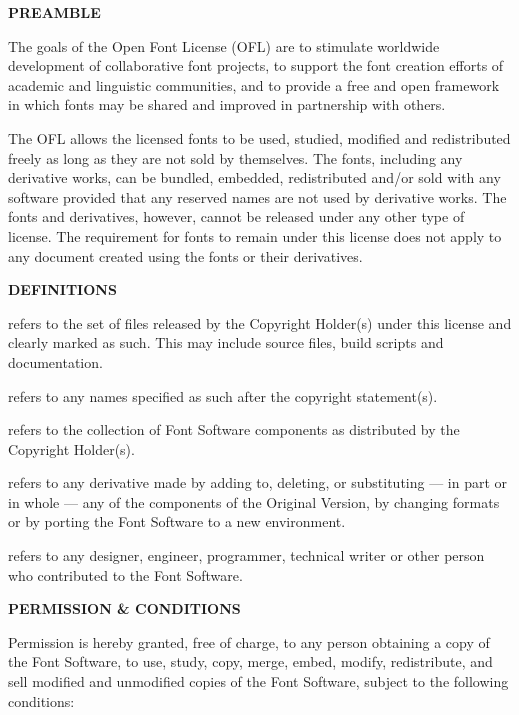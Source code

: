 
\blank

{\bf PREAMBLE}

The goals of the Open Font License (OFL) are to stimulate worldwide development of collaborative font projects, to support the font creation efforts of academic and linguistic communities, and to provide a free and open framework in which fonts may be shared and improved in partnership with others.

The OFL allows the licensed fonts to be used, studied, modified and redistributed freely as long as they are not sold by themselves. The fonts, including any derivative works, can be bundled, embedded, redistributed and/or sold with any software provided that any reserved names are not used by derivative works. The fonts and derivatives, however, cannot be released under any other type of license. The requirement for fonts to remain under this license does not apply to any document created using the fonts or their derivatives.

{\bf DEFINITIONS}

 refers to the set of files released by the Copyright Holder(s) under this license and clearly marked as such. This may include source files, build scripts and documentation.

 refers to any names specified as such after the copyright statement(s).

 refers to the collection of Font Software components as distributed by the Copyright Holder(s).

 refers to any derivative made by adding to, deleting, or substituting — in part or in whole — any of the components of the Original Version, by changing formats or by porting the Font Software to a new environment.

 refers to any designer, engineer, programmer, technical writer or other person who contributed to the Font Software.

{\bf PERMISSION & CONDITIONS}

Permission is hereby granted, free of charge, to any person obtaining a copy of the Font Software, to use, study, copy, merge, embed, modify, redistribute, and sell modified and unmodified copies of the Font Software, subject to the following conditions:

